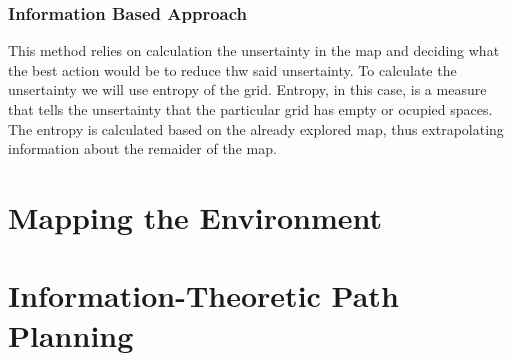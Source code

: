 \documentclass[a4paper,12pt]{article}
\begin{document}
			\subsubsection{Information Based Approach}
			This method relies on calculation the unsertainty in the map and deciding what the best action would be to reduce thw said unsertainty.
			To calculate the unsertainty we will use entropy of the grid. Entropy, in this case, is a measure that tells the unsertainty that the particular grid has empty 
			or ocupied spaces. The entropy is calculated based on the already explored map, thus extrapolating information about the remaider of the map.


	
	
	\section{Mapping the Environment}
	
	
	
	\section{Information-Theoretic Path Planning}
	
	
	
	\newpage
	
	
	\newpage
	\appendix
	\appendixpage
	\addappheadtotoc
	
\end{document}
